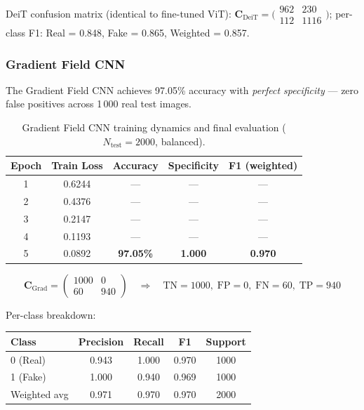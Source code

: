 \documentclass[12pt, a4paper]{article}
\begin{document}
DeiT confusion matrix (identical to fine-tuned ViT):
$\mathbf{C}_{\text{DeiT}}=\bigl(\begin{smallmatrix}962&230\\112&1116\end{smallmatrix}\bigr)$;
per-class F1: Real = 0.848, Fake = 0.865, Weighted = 0.857.

\subsubsection{Gradient Field CNN}

The Gradient Field CNN achieves 97.05\% accuracy with \emph{perfect specificity}
— zero false positives across 1\,000 real test images.

\begin{table}[H]
\centering
\caption{Gradient Field CNN training dynamics and final evaluation ($N_{\text{test}}=2000$,
balanced).}
\label{tab:grad}
\begin{tabular}{ccccc}
\toprule
\textbf{Epoch} & \textbf{Train Loss}
  & \textbf{Accuracy} & \textbf{Specificity} & \textbf{F1 (weighted)} \\
\midrule
1 & 0.6244 & — & — & — \\
2 & 0.4376 & — & — & — \\
3 & 0.2147 & — & — & — \\
4 & 0.1193 & — & — & — \\
5 & 0.0892 & \textbf{97.05\%} & \textbf{1.000} & \textbf{0.970} \\
\bottomrule
\end{tabular}
\end{table}

\begin{equation*}
\mathbf{C}_{\text{Grad}} =
\begin{pmatrix} 1000 & 0 \\ 60 & 940 \end{pmatrix}
\quad\Rightarrow\quad
\text{TN}=1000,\;\text{FP}=0,\;\text{FN}=60,\;\text{TP}=940
\end{equation*}

Per-class breakdown:
\begin{center}
\begin{tabular}{lcccc}
\toprule
\textbf{Class} & \textbf{Precision} & \textbf{Recall} & \textbf{F1} & \textbf{Support} \\
\midrule
0 (Real) & 0.943 & 1.000 & 0.970 & 1000 \\
1 (Fake) & 1.000 & 0.940 & 0.969 & 1000 \\
Weighted avg & 0.971 & 0.970 & 0.970 & 2000 \\
\bottomrule
\end{tabular}
\end{center}
\end{document}
